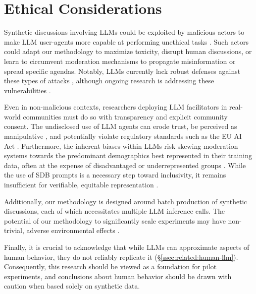 %
\section{Ethical Considerations}
\label{sec:ethical}

Synthetic discussions involving \acp{LLM} could be exploited by malicious actors to make \ac{LLM} user-agents more capable at performing unethical tasks \cite{majumdar_2024_nefarious, MARULLI20245340}. Such actors could adapt our methodology to  maximize toxicity, disrupt human discussions, or learn to circumvent moderation mechanisms to propagate misinformation or spread specific agendas. Notably, \acp{LLM} currently lack robust defenses against these types of attacks \cite{li_2025_vulnerable}, although ongoing research is addressing these vulnerabilities \cite{wang_2025_risk}.

Even in non-malicious contexts, researchers deploying \ac{LLM} facilitators in real-world communities must do so with transparency and explicit community consent. The undisclosed use of \ac{LLM} agents can erode trust, be perceived as manipulative \cite{retraction_watch}, and potentially violate regulatory standards such as the EU AI Act \cite{eu_ai_act_2024}. Furthermore, the inherent biases within \acp{LLM} risk skewing moderation systems towards the predominant demographics best represented in their training data, often at the expense of disadvantaged or underrepresented groups \cite{rossi_2024, anthis_2025, burton2024large}. While the use of \ac{SDB} prompts is a necessary step toward inclusivity, it remains insufficient for verifiable, equitable representation \cite{rossi_2024}.

Additionally, our methodology is designed around batch production of synthetic discussions, each of which necessitates multiple \ac{LLM} inference calls. The potential of our methodology to significantly scale experiments may have non-trivial, adverse environmental effects \cite{ding_2024_sustainable, Ren2024}. 

Finally, it is crucial to acknowledge that while \acp{LLM} can approximate aspects of human behavior, they do not reliably replicate it (\S\ref{ssec:related:human-llm}). Consequently, this research should be viewed as a foundation for pilot experiments, and conclusions about human behavior should be drawn with caution when based solely on synthetic data.
